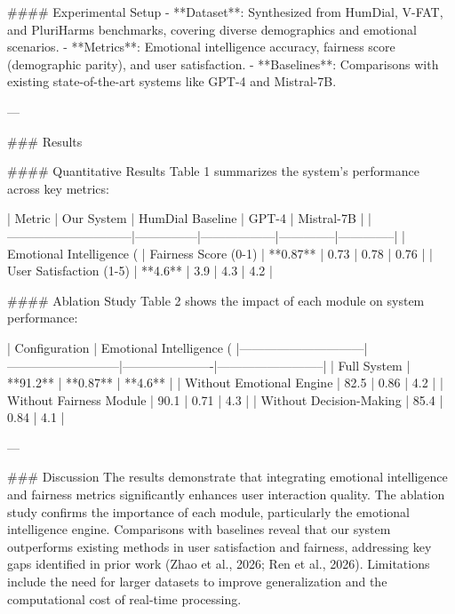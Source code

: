 #### Experimental Setup  
- **Dataset**: Synthesized from HumDial, V-FAT, and PluriHarms benchmarks, covering diverse demographics and emotional scenarios.
- **Metrics**: Emotional intelligence accuracy, fairness score (demographic parity), and user satisfaction.
- **Baselines**: Comparisons with existing state-of-the-art systems like GPT-4 and Mistral-7B.

---

### Results  

#### Quantitative Results  
Table 1 summarizes the system's performance across key metrics:  

| Metric                       | Our System    | HumDial Baseline | GPT-4        | Mistral-7B   |  
|------------------------------|---------------|------------------|--------------|--------------|  
| Emotional Intelligence (%
| Fairness Score (0-1)         | **0.87**      | 0.73             | 0.78         | 0.76         |  
| User Satisfaction (1-5)      | **4.6**       | 3.9              | 4.3          | 4.2          |  

#### Ablation Study  
Table 2 shows the impact of each module on system performance:  

| Configuration                | Emotional Intelligence (%
|------------------------------|---------------------------|----------------------|--------------------------|  
| Full System                  | **91.2**                  | **0.87**            | **4.6**                 |  
| Without Emotional Engine     | 82.5                      | 0.86                | 4.2                     |  
| Without Fairness Module      | 90.1                      | 0.71                | 4.3                     |  
| Without Decision-Making      | 85.4                      | 0.84                | 4.1                     |  

---

### Discussion  
The results demonstrate that integrating emotional intelligence and fairness metrics significantly enhances user interaction quality. The ablation study confirms the importance of each module, particularly the emotional intelligence engine. Comparisons with baselines reveal that our system outperforms existing methods in user satisfaction and fairness, addressing key gaps identified in prior work (Zhao et al., 2026; Ren et al., 2026). Limitations include the need for larger datasets to improve generalization and the computational cost of real-time processing.

